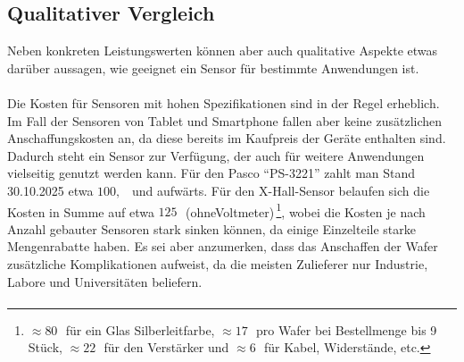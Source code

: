 \documentclass[12pt, a4paper]{article}
\begin{document}
\subsection{Qualitativer Vergleich}	
Neben konkreten Leistungswerten können aber auch qualitative Aspekte etwas darüber aussagen, wie geeignet ein Sensor für bestimmte Anwendungen ist.\paragraph{}
Die Kosten für Sensoren mit hohen Spezifikationen sind in der Regel erheblich.\newline
Im Fall der Sensoren von Tablet und Smartphone fallen aber keine zusätzlichen Anschaffungskosten an, da diese bereits im Kaufpreis der Geräte enthalten sind. Dadurch steht ein Sensor zur Verfügung, der auch für weitere Anwendungen vielseitig genutzt werden kann. Für den Pasco ``PS-3221'' zahlt man Stand 30.10.2025 etwa $100,$\texteuro~ und aufwärts.\newline 
Für den X-Hall-Sensor belaufen sich die Kosten in Summe auf etwa $125\,$\texteuro ~(ohne\newline Voltmeter)\,\footnote{$\approx80\,$\texteuro ~für ein Glas Silberleitfarbe, $\approx17\,$\texteuro ~pro Wafer bei Bestellmenge bis 9 Stück, $\approx22\,$\texteuro  ~für den Verstärker und $\approx6\,$\texteuro ~für Kabel, Widerstände, etc.}, wobei die Kosten je nach Anzahl gebauter Sensoren stark sinken können, da einige Einzelteile starke Mengenrabatte haben.\newline
Es sei aber anzumerken, dass das Anschaffen der Wafer zusätzliche Komplikationen aufweist, da die meisten Zulieferer nur Industrie, Labore und Universitäten beliefern.\paragraph{}
\end{document}
